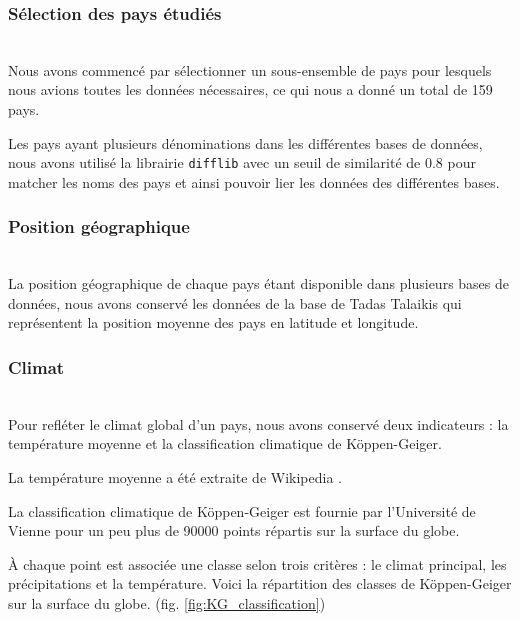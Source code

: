\documentclass[12pt]{iEEEtran}
\begin{document}
\subsubsection{Sélection des pays étudiés}\hfill\\
Nous avons commencé par sélectionner un sous-ensemble de pays pour lesquels nous avions toutes
les données nécessaires, ce qui nous a donné un total de 159 pays.

Les pays ayant plusieurs dénominations dans les différentes bases de données, nous avons utilisé
la librairie \texttt{difflib} avec un seuil de similarité de 0.8 pour matcher les noms des pays
et ainsi pouvoir lier les données des différentes bases.
\\

\subsubsection{Position géographique}\hfill\\
La position géographique de chaque pays étant disponible dans plusieurs bases de données, nous
avons conservé les données de la base de Tadas Talaikis \cite{country_pos} qui représentent
la position moyenne des pays en latitude et longitude.
\\

\subsubsection{Climat}\hfill\\
Pour refléter le climat global d'un pays, nous avons conservé deux indicateurs : la température
moyenne et la classification climatique de Köppen-Geiger.

La température moyenne a été extraite de Wikipedia \cite{mean_temp}.

La classification
climatique de Köppen-Geiger est fournie par l'Université de Vienne \cite{climate_classification}
pour un peu plus de 90000 points répartis sur la surface du globe. 

À chaque point est associée une classe selon trois critères : le climat principal,
les précipitations et la température. Voici la répartition des classes de Köppen-Geiger
sur la surface du globe. (fig. \ref{fig:KG_classification})
\end{document}
